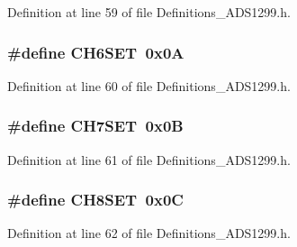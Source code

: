 Definition at line 59 of file Definitions\+\_\+\+A\+D\+S1299.\+h.

\subsubsection[{\texorpdfstring{C\+H6\+S\+ET}{CH6SET}}]{\setlength{\rightskip}{0pt plus 5cm}\#define C\+H6\+S\+ET~0x0A}\hypertarget{group__Definitions__ADS1299_ga4708b2ba51cdb3a41817f06b8982657f}{}\label{group__Definitions__ADS1299_ga4708b2ba51cdb3a41817f06b8982657f}


Definition at line 60 of file Definitions\+\_\+\+A\+D\+S1299.\+h.

\subsubsection[{\texorpdfstring{C\+H7\+S\+ET}{CH7SET}}]{\setlength{\rightskip}{0pt plus 5cm}\#define C\+H7\+S\+ET~0x0B}\hypertarget{group__Definitions__ADS1299_ga018ba15c7462bc82cae0c3695d4c0ed0}{}\label{group__Definitions__ADS1299_ga018ba15c7462bc82cae0c3695d4c0ed0}


Definition at line 61 of file Definitions\+\_\+\+A\+D\+S1299.\+h.

\subsubsection[{\texorpdfstring{C\+H8\+S\+ET}{CH8SET}}]{\setlength{\rightskip}{0pt plus 5cm}\#define C\+H8\+S\+ET~0x0C}\hypertarget{group__Definitions__ADS1299_ga9e870ff4a991cadaab80c387e09b33de}{}\label{group__Definitions__ADS1299_ga9e870ff4a991cadaab80c387e09b33de}


Definition at line 62 of file Definitions\+\_\+\+A\+D\+S1299.\+h.

